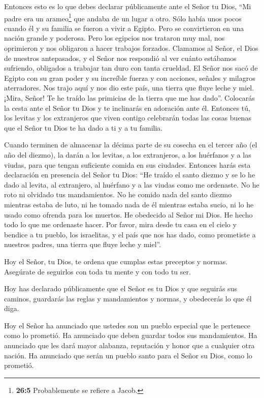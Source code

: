  Entonces esto es lo que debes declarar públicamente ante el
Señor tu Dios, ``Mi padre era un arameo\footnote{\textbf{26:5}
  Probablemente se refiere a Jacob.} que andaba de un lugar a otro. Sólo
había unos pocos cuando él y su familia se fueron a vivir a Egipto. Pero
se convirtieron en una nación grande y poderosa.  Pero los
egipcios nos trataron muy mal, nos oprimieron y nos obligaron a hacer
trabajos forzados.  Clamamos al Señor, el Dios de nuestros
antepasados, y el Señor nos respondió al ver cuánto estábamos sufriendo,
obligados a trabajar tan duro con tanta crueldad.  El Señor
nos sacó de Egipto con su gran poder y su increíble fuerza y con
acciones, señales y milagros aterradores.  Nos trajo aquí y
nos dio este país, una tierra que fluye leche y miel. 
¡Mira, Señor! Te he traído las primicias de la tierra que me has dado''.
Colocarás la cesta ante el Señor tu Dios y te inclinarás en adoración
ante él.  Entonces tú, los levitas y los extranjeros que
viven contigo celebrarán todas las cosas buenas que el Señor tu Dios te
ha dado a ti y a tu familia.

 Cuando terminen de almacenar la décima parte de su cosecha
en el tercer año (el año del diezmo), la darán a los levitas, a los
extranjeros, a los huérfanos y a las viudas, para que tengan suficiente
comida en sus ciudades.  Entonces harás esta declaración en
presencia del Señor tu Dios: ``He traído el santo diezmo y se lo he dado
al levita, al extranjero, al huérfano y a las viudas como me ordenaste.
No he roto ni olvidado tus mandamientos.  No he comido nada
del santo diezmo mientras estaba de luto, ni he tomado nada de él
mientras estaba sucio, ni lo he usado como ofrenda para los muertos. He
obedecido al Señor mi Dios. He hecho todo lo que me ordenaste hacer.
 Por favor, mira desde tu casa en el cielo y bendice a tu
pueblo, los israelitas, y el país que nos has dado, como prometiste a
nuestros padres, una tierra que fluye leche y miel''.

 Hoy el Señor, tu Dios, te ordena que cumplas estas
preceptos y normas. Asegúrate de seguirlos con toda tu mente y con todo
tu ser.

 Hoy has declarado públicamente que el Señor es tu Dios y
que seguirás sus caminos, guardarás las reglas y mandamientos y normas,
y obedecerás lo que él diga.

 Hoy el Señor ha anunciado que ustedes son un pueblo
especial que le pertenece como lo prometió. Ha anunciado que deben
guardar todos sus mandamientos.  Ha anunciado que les dará
mayor alabanza, reputación y honor que a cualquier otra nación. Ha
anunciado que serán un pueblo santo para el Señor su Dios, como lo
prometió.

